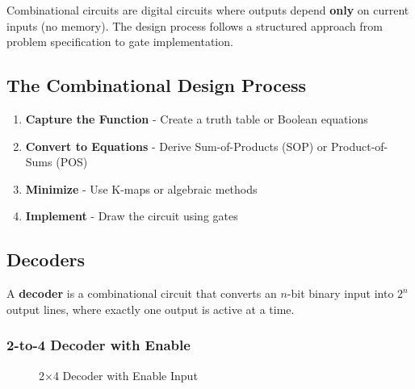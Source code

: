 \documentclass[12pt,a4paper]{article}
\begin{document}
\begin{conceptbox}
Combinational circuits are digital circuits where outputs depend \textbf{only} on current inputs (no memory). The design process follows a structured approach from problem specification to gate implementation.
\end{conceptbox}

\subsection{The Combinational Design Process}

\begin{enumerate}[label=\textbf{Step \arabic*:}]
  \item \textbf{Capture the Function} - Create a truth table or Boolean equations
  \item \textbf{Convert to Equations} - Derive Sum-of-Products (SOP) or Product-of-Sums (POS)
  \item \textbf{Minimize} - Use K-maps or algebraic methods
  \item \textbf{Implement} - Draw the circuit using gates
\end{enumerate}

\subsection{Decoders}

\begin{conceptbox}
A \textbf{decoder} is a combinational circuit that converts an $n$-bit binary input into $2^n$ output lines, where exactly one output is active at a time.
\end{conceptbox}

\subsubsection{2-to-4 Decoder with Enable}

\begin{figure}[H]
\centering
{}
\caption{2×4 Decoder with Enable Input}
\end{figure}
\end{document}
